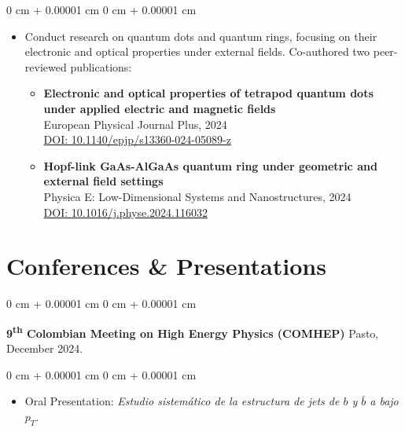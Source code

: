\documentclass[10pt, letterpaper]{article}
\newenvironment{highlights}{
    \begin{itemize}[
        topsep=0.10 cm,
        parsep=0.10 cm,
        partopsep=0pt,
        itemsep=0pt,
        leftmargin=0 cm + 10pt
    ]
}{
    \end{itemize}
} %
\newenvironment{onecolentry}{
    \begin{adjustwidth}{
        0 cm + 0.00001 cm
    }{
        0 cm + 0.00001 cm
    }
}{
    \end{adjustwidth}
} %
\newenvironment{twocolentry}[2][]{
    \onecolentry
    \def\secondColumn{#2}
    \setcolumnwidth{\fill, 4.5 cm}
    \begin{paracol}{2}
}{
    \switchcolumn \raggedleft \secondColumn
    \end{paracol}
    \endonecolentry
} %
\begin{document}
        \vspace{0.10 cm}
        \begin{onecolentry}
            \begin{highlights}
                    \item Conduct research on quantum dots and quantum rings, focusing on their electronic and optical properties under external fields. Co-authored two peer-reviewed publications:
                        \begin{itemize}
        \item \textbf{Electronic and optical properties of tetrapod quantum dots under applied electric and magnetic fields} \\
        European Physical Journal Plus, 2024 \\
        \href{https://doi.org/10.1140/epjp/s13360-024-05089-z}{DOI: 10.1140/epjp/s13360-024-05089-z}
        \item \textbf{Hopf-link GaAs-AlGaAs quantum ring under geometric and external field settings} \\
        Physica E: Low-Dimensional Systems and Nanostructures, 2024 \\
        \href{https://doi.org/10.1016/j.physe.2024.116032}{DOI: 10.1016/j.physe.2024.116032}
    \end{itemize}
            \end{highlights}
        \end{onecolentry}


    
    \section{Conferences \& Presentations}



        
        \begin{twocolentry}{
            Pasto, December 2024.
        }
            \textbf{9\textsuperscript{th} Colombian Meeting on High Energy Physics (COMHEP)}\end{twocolentry}

        \vspace{0.10 cm}
        \begin{onecolentry}
            \begin{highlights}
                \item Oral Presentation: \textit{Estudio sistemático de la estructura de jets de $b$ y $\bar{b}$ a bajo $p_T$}.
            \end{highlights}
        \end{onecolentry}
\end{document}
